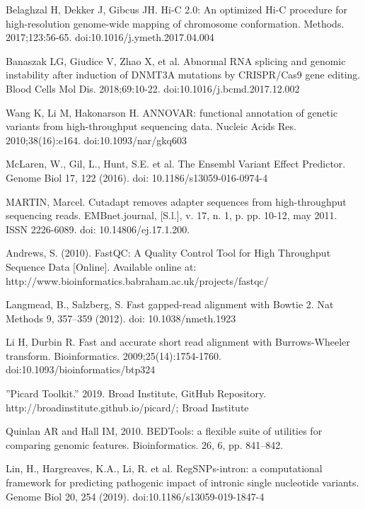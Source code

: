 \documentclass[a4paper,12pt]{article}
\begin{document}
\begin{thebibliography}{300}
Belaghzal H, Dekker J, Gibcus JH. Hi-C 2.0: An optimized Hi-C procedure for high-resolution genome-wide mapping of chromosome conformation. Methods. 2017;123:56-65. doi:10.1016/j.ymeth.2017.04.004

Banaszak LG, Giudice V, Zhao X, et al. Abnormal RNA splicing and genomic instability after induction of DNMT3A mutations by CRISPR/Cas9 gene editing. Blood Cells Mol Dis. 2018;69:10-22. doi:10.1016/j.bcmd.2017.12.002


Wang K, Li M, Hakonarson H. ANNOVAR: functional annotation of genetic variants from high-throughput sequencing data. Nucleic Acids Res. 2010;38(16):e164. doi:10.1093/nar/gkq603

McLaren, W., Gil, L., Hunt, S.E. et al. The Ensembl Variant Effect Predictor. Genome Biol 17, 122 (2016). doi: 10.1186/s13059-016-0974-4

MARTIN, Marcel. Cutadapt removes adapter sequences from high-throughput sequencing reads. EMBnet.journal, [S.l.], v. 17, n. 1, p. pp. 10-12, may 2011. ISSN 2226-6089. doi: 10.14806/ej.17.1.200. 

Andrews, S. (2010). FastQC:  A Quality Control Tool for High Throughput Sequence Data [Online]. Available online at: http://www.bioinformatics.babraham.ac.uk/projects/fastqc/

Langmead, B., Salzberg, S. Fast gapped-read alignment with Bowtie 2. Nat Methods 9, 357–359 (2012). doi: 10.1038/nmeth.1923

Li H, Durbin R. Fast and accurate short read alignment with Burrows-Wheeler transform. Bioinformatics. 2009;25(14):1754-1760. doi:10.1093/bioinformatics/btp324

''Picard Toolkit.'' 2019. Broad Institute, GitHub Repository. http://broadinstitute.github.io/picard/; Broad Institute

Quinlan AR and Hall IM, 2010. BEDTools: a flexible suite of utilities for comparing genomic features. Bioinformatics. 26, 6, pp. 841–842.


Lin, H., Hargreaves, K.A., Li, R. et al. RegSNPs-intron: a computational framework for predicting pathogenic impact of intronic single nucleotide variants. Genome Biol 20, 254 (2019). doi:10.1186/s13059-019-1847-4


\end{thebibliography}
\end{document}
